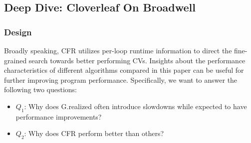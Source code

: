 \vspace{-1ex}
\subsection{Deep Dive: Cloverleaf On Broadwell} \label{case-study}


\subsubsection{\textbf{Design}}

Broadly speaking, CFR utilizes per-loop runtime
information to direct the fine-grained search towards better
performing CVs.  Insights about the performance characteristics of
different algorithms compared in this paper can be useful for further
improving program performance.  Specifically, we want to answer the
following two questions:
\begin{itemize}
\item \textbf{$Q_1$}: Why does G.realized often introduce slowdowns
  while expected to have performance improvements?
\item \textbf{$Q_2$}: Why does CFR perform better than others?
\end{itemize}

